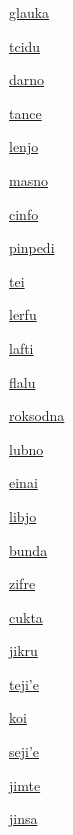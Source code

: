 {\hyperlink{val:glauka}{glauka}}{}{}{}

{\hyperlink{val:tcidu}{tcidu}}{}{}{}

{\hyperlink{val:darno}{darno}}{}{}{}

{\hyperlink{val:tance}{tance}}{}{}{}

{\hyperlink{val:lenjo}{lenjo}}{}{}{}

{\hyperlink{val:masno}{masno}}{}{}{}

{\hyperlink{val:cinfo}{cinfo}}{}{}{}

{\hyperlink{val:pinpedi}{pinpedi}}{}{}{}

{\hyperlink{val:tei}{tei}}{}{}{}

{\hyperlink{val:lerfu}{lerfu}}{}{}{}

{\hyperlink{val:lafti}{lafti}}{}{}{}

{\hyperlink{val:flalu}{flalu}}{}{}{}

{\hyperlink{val:roksodna}{roksodna}}{}{}{}

{\hyperlink{val:lubno}{lubno}}{}{}{}

{\hyperlink{val:einai}{einai}}{}{}{}

{\hyperlink{val:libjo}{libjo}}{}{}{}

{\hyperlink{val:bunda}{bunda}}{}{}{}

{\hyperlink{val:zifre}{zifre}}{}{}{}

{\hyperlink{val:cukta}{cukta}}{}{}{}

{\hyperlink{val:jikru}{jikru}}{}{}{}

{\hyperlink{val:tejihe}{teji'e}}{}{}{}

{\hyperlink{val:koi}{koi}}{}{}{}

{\hyperlink{val:sejihe}{seji'e}}{}{}{}

{\hyperlink{val:jimte}{jimte}}{}{}{}

{\hyperlink{val:jinsa}{jinsa}}{}{}{}

